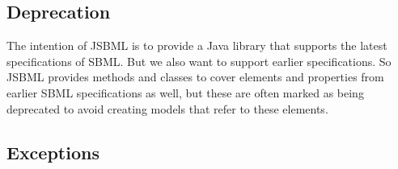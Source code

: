\subsection{Deprecation}

The intention of JSBML is to provide a Java library
that supports the latest specifications of SBML.
%
%
But we also want to support earlier specifications. So JSBML provides methods
and classes to cover elements and properties from earlier SBML specifications as
well, but these are often marked as being deprecated to avoid creating models
that refer to these elements.

\subsection{Exceptions}

